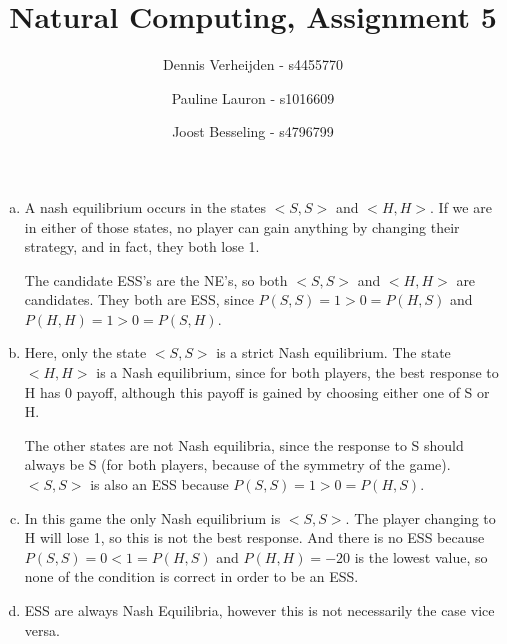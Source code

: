 \documentclass[11pt]{article}
\title{Natural Computing, Assignment 5}
\author{Dennis Verheijden - s4455770 \and Pauline Lauron - s1016609 \and Joost Besseling - s4796799}
\begin{document}
\maketitle

\section{}
\begin{enumerate}[(a)]
	\item A nash equilibrium occurs in the states $<S,S>$ and $<H,H>$. If we are in either of those states, no player can gain anything by changing their strategy, and in fact, they both lose 1.
	
	The candidate ESS's are the NE's, so both $<S,S>$ and $<H,H>$ are candidates. They both are ESS, since $P(S,S) = 1 > 0 = P(H,S)$ and $P(H,H) = 1 > 0 = P(S,H)$.
	
	\item Here, only the state $<S,S>$ is a strict Nash equilibrium. The state $<H,H>$ is a Nash equilibrium, since for both players, the best response to H has 0 payoff, although this payoff is gained by choosing either one of S or H. 
	
	The other states are not Nash equilibria, since the response to S should always be S (for both players, because of the symmetry of the game). $<S,S>$ is also an ESS because $P(S,S) = 1 > 0 = P(H,S)$.  
	
	\item In this game the only Nash equilibrium is $<S,S>$. The player changing to H will lose 1, so this is not the best response. And there is no ESS because $P(S,S) = 0 <  1 = P(H,S)$ and $P(H,H) = -20$ is the lowest value, so none of the condition is correct in order to be an ESS. 
	
	\item ESS are always Nash Equilibria, however this is not necessarily the case vice versa. %
\end{enumerate}
\end{document}
